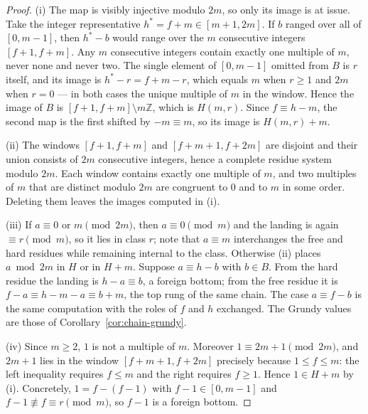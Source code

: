 \begin{proof}
(i) The map is visibly injective modulo $2m$, so only its image is at
issue. Take the integer representative $h^* = f + m \in [m+1, 2m]$. If
$b$ ranged over all of $[0, m-1]$, then $h^* - b$ would range over the
$m$ consecutive integers $[f+1, f+m]$. Any $m$ consecutive integers
contain exactly one multiple of $m$, never none and never two. The single
element of $[0, m-1]$ omitted from $B$ is $r$ itself, and its image is
$h^* - r = f + m - r$, which equals $m$ when $r \ge 1$ and $2m$ when
$r = 0$ --- in both cases the unique multiple of $m$ in the window. Hence
the image of $B$ is $[f+1, f+m] \setminus m\mathbb{Z}$, which is
$H(m,r)$. Since $f \equiv h - m$, the second map is the first shifted by
$-m \equiv m$, so its image is $H(m,r) + m$.

(ii) The windows $[f+1, f+m]$ and $[f+m+1, f+2m]$ are disjoint and their
union consists of $2m$ consecutive integers, hence a complete residue
system modulo $2m$. Each window contains exactly one multiple of $m$, and
two multiples of $m$ that are distinct modulo $2m$ are congruent to $0$
and to $m$ in some order. Deleting them leaves the images computed in
(i).

(iii) If $a \equiv 0$ or $m \pmod{2m}$, then $a \equiv 0 \pmod m$ and the
landing is again $\equiv r \pmod m$, so it lies in class $r$; note that
$a \equiv m$ interchanges the free and hard residues while remaining
internal to the class. Otherwise (ii) places $a \bmod 2m$ in $H$ or in
$H + m$. Suppose $a \equiv h - b$ with $b \in B$. From the hard residue
the landing is $h - a \equiv b$, a foreign bottom; from the free residue
it is $f - a \equiv h - m - a \equiv b + m$, the top rung of the same
chain. The case $a \equiv f - b$ is the same computation with the roles
of $f$ and $h$ exchanged. The Grundy values are those of
Corollary~\ref{cor:chain-grundy}.

(iv) Since $m \ge 2$, $1$ is not a multiple of $m$. Moreover
$1 \equiv 2m + 1 \pmod{2m}$, and $2m + 1$ lies in the window
$[f+m+1, f+2m]$ precisely because $1 \le f \le m$: the left inequality
requires $f \le m$ and the right requires $f \ge 1$. Hence $1 \in H + m$
by (i). Concretely, $1 = f - (f-1)$ with $f - 1 \in [0, m-1]$ and
$f - 1 \not\equiv f \equiv r \pmod m$, so $f - 1$ is a foreign bottom.
\end{proof}

